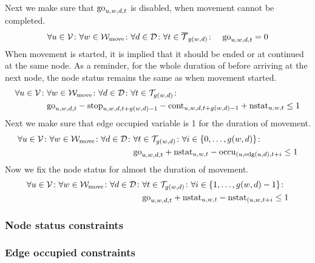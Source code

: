 Next we make sure that $\mathrm{go}_{u,w,d,t}$ is disabled, when movement cannot be
completed.
\begin{align}
    &\forall u \in \mathcal{V} \colon \forall w \in \mathcal{W}_\mathrm{move} \colon \forall d \in \mathcal{D} \colon
    \forall t \in \overline{\mathcal{T}}_{g(w,d)} \colon & \mathrm{go}_{u,w,d,t} = 0
\end{align}
When movement is started, it is implied that it should be ended or at continued
at the same node. As a reminder, for the whole duration of before arriving at
the next node, the node status remains the same as when movement started.
\begin{equation}
    \begin{split}
        \forall u \in \mathcal{V} \colon &\forall w \in \mathcal{W}_\mathrm{move} \colon \forall d \in \mathcal{D}
        \colon \forall t \in \mathcal{T}_{g(w,d)} \colon\\ & \mathrm{go}_{u,w,d,t} -
        \mathrm{stop}_{u,w,d,t+g(w,d)-1} - \mathrm{cont}_{u,w,d,t+g(w,d)-1} + \mathrm{nstat}_{u,w,t}
        \leq 1
    \end{split}
\end{equation}
Next we make sure that edge occupied variable is 1 for the duration of
movement.
\begin{equation}
    \begin{split}
        \forall u \in \mathcal{V} \colon \forall w \in \mathcal{W}_\mathrm{move} \colon \forall d \in \mathcal{D}
        \colon &\forall t \in \mathcal{T}_{g(w,d)} \colon \forall i \in
        \{0,\ldots,g(w,d)\} \colon\\ & \mathrm{go}_{u,w,d,t} + \mathrm{nstat}_{u,w,t}
        -\mathrm{occu}_{(u,\mathrm{edg}(u,d),t+i} \leq 1
    \end{split}
\end{equation}
Now we fix the node status for almost the duration of movement.
\begin{equation}
    \begin{split}
        \forall u \in \mathcal{V} \colon \forall w \in \mathcal{W}_\mathrm{move} \colon \forall d \in \mathcal{D}
        \colon &\forall t \in \mathcal{T}_{g(w,d)} \colon \forall i \in
        \{1,\ldots,g(w,d)-1\} \colon\\ & \mathrm{go}_{u,w,d,t} + \mathrm{nstat}_{u,w,t}
        -\mathrm{nstat}_{(u,w,t+i} \leq 1
    \end{split}
\end{equation}

\subsubsection{Node status constraints}
\subsubsection{Edge occupied constraints}
